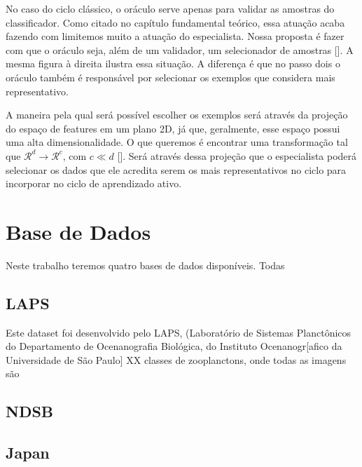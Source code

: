 No caso do ciclo clássico, o oráculo serve apenas para validar as amostras do classificador. Como citado no capítulo fundamental teórico, essa atuação acaba fazendo com limitemos muito a atuação do especialista. Nossa proposta é fazer com que o oráculo seja, além de um validador, um selecionador de amostras [\cite{kottke2018other}]. A mesma figura à direita ilustra essa situação. A diferença é que no passo dois o oráculo também é responsável por selecionar os exemplos que considera mais representativo. 

A maneira pela qual será possível escolher os exemplos será através da projeção do espaço de features em um plano 2D, já que, geralmente, esse espaço possui uma alta dimensionalidade. O que queremos é encontrar uma transformação tal que $\mathcal{R}^d \xrightarrow{} \mathcal{R}^c$, com $c \ll d$ [\cite{van2009dimensionality}]. Será através dessa projeção que o especialista poderá selecionar os dados que ele acredita serem os mais representativos no ciclo para incorporar no ciclo de aprendizado ativo. 





\section{Base de Dados}
\label{sec:base_de_dados}

Neste trabalho teremos quatro bases de dados disponíveis. Todas 


\subsection{LAPS} 
\label{sec:basededados_laps}

Este dataset foi desenvolvido pelo LAPS,  (Laboratório de Sistemas Planctônicos do Departamento de Ocenanografia Biológica, do Instituto Ocenanogr[afico da Universidade de São Paulo]
XX classes de zooplanctons, onde todas as imagens são


\subsection{NDSB} 
\label{sec:basededados_ndsb}



\subsection{Japan} 
\label{sec:basededados_japan}



